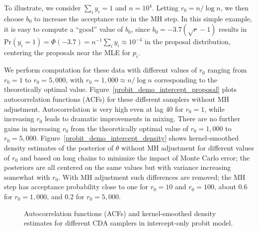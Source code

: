 \documentclass[twoside,11pt]{article}
\newcommand{\1}{\mathbf 1}
\begin{document}
To illustrate, we consider  $\sum_i y_i =1$ and $n=10^4$. Letting $r_0 = n/\log n$, we then choose $b_0$ to increase the acceptance rate in the MH step. In this simple example, it is easy to compute a ``good'' value of $b_0$, since $b_0 = -3.7 (\sqrt r -1)$ results in $\mbox{Pr}(y_i = 1) = \Phi(-3.7) = n^{-1}\sum_i y_i  \approx 10^{-4}$ in the proposal distribution, centering the proposals near the MLE for $p_i$.

We perform computation for these data with different values of $r_0$ ranging from $r_0=1$ to $r_0=5,000$, with $r_0=1,000 \approx n/\log n$ corresponding to the theoretically optimal value.  Figure~\ref{probit_demo_intercept_proposal} plots autocorrelation functions (ACFs) for these different samplers without  MH adjustment. Autocorrelation is very high even at lag 40 for $r_0=1$, while increasing $r_0$ leads to dramatic improvements in mixing. There are no further gains in increasing $r_0$ from the theoretically optimal value of $r_0=1,000$ to $r_0=5,000$. Figure~\ref{probit_demo_intercept_density} shows kernel-smoothed density estimates of the posterior of $\theta$ without MH adjustment for different values of $r_0$ and based on long chains to minimize the impact of Monte Carlo error; the posteriors are all centered on the same values but with variance increasing somewhat with $r_0$.  With MH adjustment such differences are removed; the MH step has acceptance probability close to one for $r_0=10$ and $r_0=100$, about 0.6 for $r_0=1,000$, and 0.2 for $r_0=5,000$. 


\begin{figure}[H]
  {%
  }
   \label{probit_demo_intercept}
     {\caption{Autocorrelation functions (ACFs) and kernel-smoothed density estimates for different CDA samplers in intercept-only probit model.}}
\end{figure}
\end{document}
